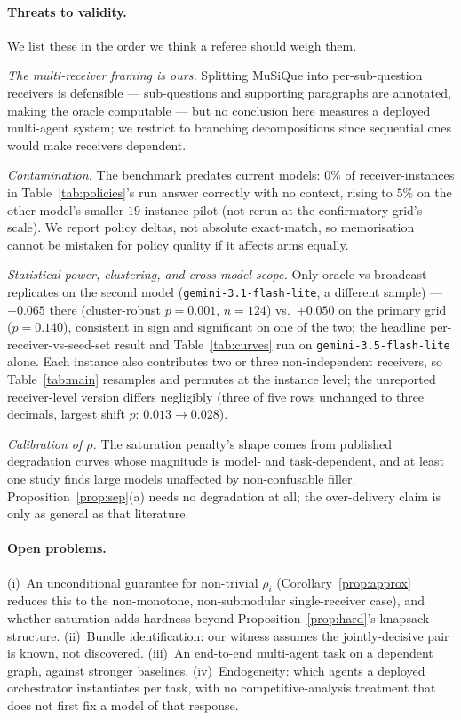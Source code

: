 \documentclass[sigconf,anonymous]{aamas}
\theoremstyle{remark}
\begin{document}
\paragraph{Threats to validity.} We list these in the order we think a
referee should weigh them.

\emph{The multi-receiver framing is ours.} Splitting MuSiQue into
per-sub-question receivers is defensible --- sub-questions and
supporting paragraphs are annotated, making the oracle computable ---
but no conclusion here measures a deployed multi-agent system; we
restrict to branching decompositions since sequential ones would make
receivers dependent.

\emph{Contamination.} The benchmark predates current models: $0\%$ of
receiver-instances in Table~\ref{tab:policies}'s run answer correctly
with no context, rising to $5\%$ on the other model's smaller
$19$-instance pilot (not rerun at the confirmatory grid's scale). We
report policy deltas, not absolute exact-match, so memorisation cannot
be mistaken for policy quality if it affects arms equally.

\emph{Statistical power, clustering, and cross-model scope.} Only
oracle-vs-broadcast replicates on the second model
(\texttt{gemini-3.1-flash-lite}, a different sample) --- $+0.065$
there (cluster-robust $p=0.001$, $n{=}124$) vs.\ $+0.050$ on the
primary grid ($p=0.140$), consistent in sign and significant on one of
the two; the headline per-receiver-vs-seed-set result and
Table~\ref{tab:curves} run on \texttt{gemini-3.5-flash-lite} alone.
Each instance also contributes two or three non-independent receivers,
so Table~\ref{tab:main} resamples and permutes at the instance level;
the unreported receiver-level version differs negligibly (three of
five rows unchanged to three decimals, largest shift
$p{:}\,0.013\to0.028$).

\emph{Calibration of $\rho$.} The saturation penalty's shape comes from
published degradation curves whose magnitude is model- and
task-dependent, and at least one study finds large models unaffected by
non-confusable filler. Proposition~\ref{prop:sep}(a) needs no
degradation at all; the over-delivery claim is only as general as that
literature.

\paragraph{Open problems.} (i)~An unconditional guarantee for
non-trivial $\rho_i$ (Corollary~\ref{prop:approx} reduces this to the
non-monotone, non-submodular single-receiver case), and whether
saturation adds hardness beyond Proposition~\ref{prop:hard}'s knapsack
structure. (ii)~Bundle identification: our witness assumes the
jointly-decisive pair is known, not discovered. (iii)~An end-to-end
multi-agent task on a dependent graph, against stronger baselines.
(iv)~Endogeneity: which agents a deployed orchestrator instantiates per
task, with no competitive-analysis treatment that does not first fix a
model of that response.
\end{document}
